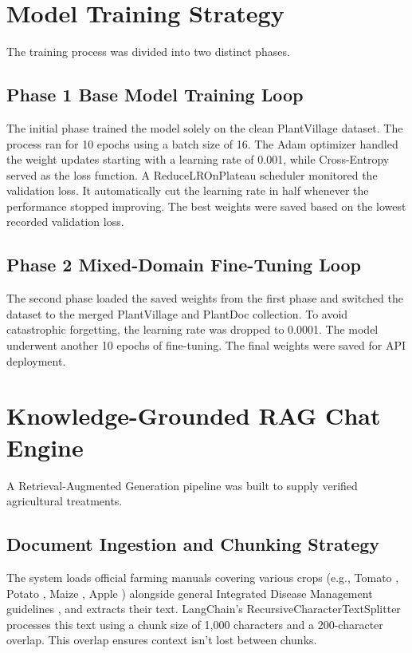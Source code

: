 \documentclass[12pt, a4paper]{report}
\begin{document}
\section{Model Training Strategy}
The training process was divided into two distinct phases.

\subsection{Phase 1 Base Model Training Loop}
The initial phase trained the model solely on the clean PlantVillage dataset. The process ran for 10 epochs using a batch size of 16. The Adam optimizer handled the weight updates starting with a learning rate of 0.001, while Cross-Entropy served as the loss function. A ReduceLROnPlateau scheduler monitored the validation loss. It automatically cut the learning rate in half whenever the performance stopped improving. The best weights were saved based on the lowest recorded validation loss.

\subsection{Phase 2 Mixed-Domain Fine-Tuning Loop}
The second phase loaded the saved weights from the first phase and switched the dataset to the merged PlantVillage and PlantDoc collection. To avoid catastrophic forgetting, the learning rate was dropped to 0.0001. The model underwent another 10 epochs of fine-tuning. The final weights were saved for API deployment.

\section{Knowledge-Grounded RAG Chat Engine}
A Retrieval-Augmented Generation pipeline was built to supply verified agricultural treatments.

\subsection{Document Ingestion and Chunking Strategy}
The system loads official farming manuals covering various crops (e.g., Tomato \cite{nhb_tomato}, Potato \cite{nhb_potato}, Maize \cite{seedco_maize}, Apple \cite{vikaspedia_apple}) alongside general Integrated Disease Management guidelines \cite{idm_concept}, and extracts their text. LangChain's RecursiveCharacterTextSplitter processes this text using a chunk size of 1,000 characters and a 200-character overlap. This overlap ensures context isn't lost between chunks.
\end{document}
